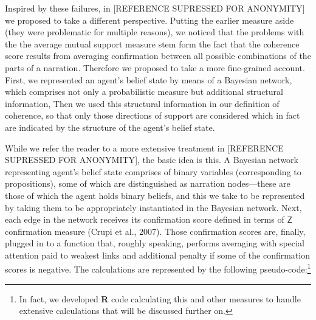 \documentclass[
  10pt,
]{scrartcl}
\begin{document}
Inspired by these failures, in {[}REFERENCE SUPRESSED FOR ANONYMITY{]} we proposed to take a different perspective. Putting the earlier measure aside (they were problematic for multiple reasons), we noticed that the problems with the the average mutual support measure stem form the fact that the coherence score results from averaging confirmation between all possible combinations of the parts of a narration. Therefore we proposed to take a more fine-grained account. First, we represented an agent's belief state by means of a Bayesian network, which comprises not only a probabilistic measure but additional structural information, Then we used this structural information in our definition of coherence, so that only those directions of support are considered which in fact are indicated by the structure of the agent's belief state.

While we refer the reader to a more extensive treatment in {[}REFERENCE SUPRESSED FOR ANONYMITY{]}, the basic idea is this. A Bayesian network representing agent's belief state comprises of binary variables (corresponding to propositions), some of which are distinguished as narration nodes---these are those of which the agent holds binary beliefs, and this we take to be represented by taking them to be appropriately instantiated in the Bayesian network. Next, each edge in the network receives its confirmation score defined in terms of \(\mathsf{Z}\) confirmation measure (Crupi et al., 2007). Those confirmation scores are, finally, plugged in to a function that, roughly speaking, performs averaging with special attention paid to weakest links and additional penalty if some of the confirmation scores is negative. The calculations are represented by the following pseudo-code:\footnote{In fact, we developed \textbf{\textsf{R}} code calculating this and other measures to handle extensive calculations that will be discussed further on.}

\pagebreak 
\footnotesize
\end{document}
